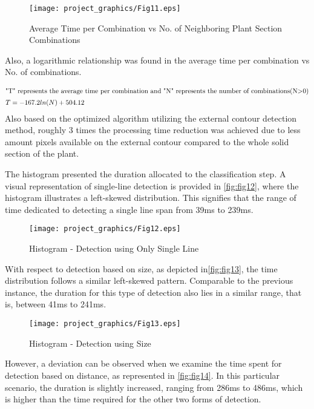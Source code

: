 \documentclass[]{iat}
\begin{document}
\par
\FloatBarrier
\begin{figure}[h]
	\texttt{[image: project\_graphics/Fig11.eps]}
	\caption{Average Time per Combination vs No. of Neighboring Plant Section Combinations }
	\label{fig:fig11}
\end{figure}
Also, a logarithmic relationship was found in the average time per combination vs No. of combinations. 
\par
\FloatBarrier
\begin{align}
\intertext{"T" represents the average time per combination and "N" represents the number of combinations(N>0)}
T &=-167.2ln(N)+504.12
\end{align}
Also based on the optimized algorithm utilizing the external contour detection method, roughly 3 times the processing time reduction was achieved due to less amount pixels available on the external contour compared to the whole solid section of the plant.
\par
The histogram presented the duration allocated to the classification step. A visual representation of single-line detection is provided in \autoref{fig:fig12}, where the histogram illustrates a left-skewed distribution. This signifies that the range of time dedicated to detecting a single line span from 39ms to 239ms.
\par
\FloatBarrier
\begin{figure}[h]
	\texttt{[image: project\_graphics/Fig12.eps]}
	\caption{Histogram - Detection using Only Single Line  }
	\label{fig:fig12}
\end{figure}
\par
With respect to detection based on size, as depicted in\autoref{fig:fig13}, the time distribution follows a similar left-skewed pattern. Comparable to the previous instance, the duration for this type of detection also lies in a similar range, that is, between 41ms to 241ms.
\par
\FloatBarrier
\begin{figure}[h]
	\texttt{[image: project\_graphics/Fig13.eps]}
	\caption{Histogram - Detection using Size  }
	\label{fig:fig13}
\end{figure}
\par
However, a deviation can be observed when we examine the time spent for detection based on distance, as represented in \autoref{fig:fig14}. In this particular scenario, the duration is slightly increased, ranging from 286ms to 486ms, which is higher than the time required for the other two forms of detection.
\end{document}

